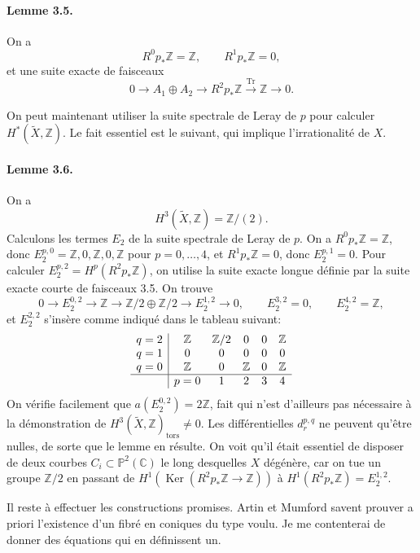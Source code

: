 \documentclass[10pt]{article}
\newcommand{\C}{\mathbb C}
\newcommand{\Pj}{\mathbb P}
\newcommand{\Z}{\mathbb Z}
\newcommand{\Tr}{\operatorname{Tr}}
\newcommand{\Ker}{\operatorname{Ker}}
\newcommand{\tors}{\operatorname{tors}}
\begin{document}
\paragraph{Lemme 3.5.} On a
\[
R^0p_*\Z=\Z,
\qquad R^1p_*\Z=0,
\]
et une suite exacte de faisceaux
\[
0\longrightarrow A_1\oplus A_2\longrightarrow R^2p_*\Z\xrightarrow{\Tr}\Z\longrightarrow0.
\]

On peut maintenant utiliser la suite spectrale de Leray de \(p\) pour calculer \(H^*(\widetilde X,\Z)\). Le fait essentiel est le suivant, qui implique l'irrationalité de \(X\).

\paragraph{Lemme 3.6.} On a
\[
H^3(\widetilde X,\Z)=\Z/(2).
\]
Calculons les termes \(E_2\) de la suite spectrale de Leray de \(p\). On a \(R^0p_*\Z=\Z\), donc \(E_2^{p,0}=\Z,0,\Z,0,\Z\) pour \(p=0,\ldots,4\), et \(R^1p_*\Z=0\), donc \(E_2^{p,1}=0\). Pour calculer \(E_2^{p,2}=H^p(R^2p_*\Z)\), on utilise la suite exacte longue définie par la suite exacte courte de faisceaux 3.5. On trouve
\[
0\to E_2^{0,2}\to\Z\to\Z/2\oplus\Z/2\to E_2^{1,2}\to0,
\qquad E_2^{3,2}=0,
\qquad E_2^{4,2}=\Z,
\]
et \(E_2^{2,2}\) s'insère comme indiqué dans le tableau suivant:
\[
\begin{array}{c|ccccc}
q=2&\Z&\Z/2&0&0&\Z\\
q=1&0&0&0&0&0\\
q=0&\Z&0&\Z&0&\Z\\ \hline
&p=0&1&2&3&4
\end{array}
\]
On vérifie facilement que \(a(E_2^{0,2})=2\Z\), fait qui n'est d'ailleurs pas nécessaire à la démonstration de \(H^3(\widetilde X,\Z)_{\tors}\ne0\). Les différentielles \(d_r^{p,q}\) ne peuvent qu'être nulles, de sorte que le lemme en résulte. On voit qu'il était essentiel de disposer de deux courbes \(C_i\subset\Pj^2(\C)\) le long desquelles \(X\) dégénère, car on tue un groupe \(\Z/2\) en passant de \(H^1(\Ker(R^2p_*\Z\to\Z))\) à \(H^1(R^2p_*\Z)=E_2^{1,2}\).

Il reste à effectuer les constructions promises. Artin et Mumford savent prouver a priori l'existence d'un fibré en coniques du type voulu. Je me contenterai de donner des équations qui en définissent un.
\end{document}
